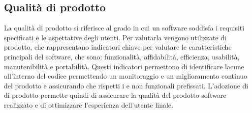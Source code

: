 \subsection{Qualità di prodotto}
\label{subsec:obiettivi_prodotto}
La qualità di prodotto si riferisce al grado in cui un software soddisfa i requisiti specificati e le aspettative degli utenti.
Per valutarla vengono utilizzate  di prodotto, che rappresentano indicatori chiave per valutare le caratteristiche principali del software, che sono:
funzionalità, affidabilità, efficienza, usabilità, manutenibilità e portabilità.
Questi indicatori permettono di identificare lacune all'interno del codice permettendo un monitoraggio e un miglioramento continuo del prodotto
e assicurando che rispetti i  e non funzionali prefissati.
L'adozione di  di prodotto permette quindi di assicurare la qualità del prodotto software realizzato e di ottimizzare l'esperienza 
dell'utente finale.

\begin{table}[H]
    \centering
    \caption{Metriche di prodotto}
    \label{tab:metriche_prodotto} 
\end{table}


